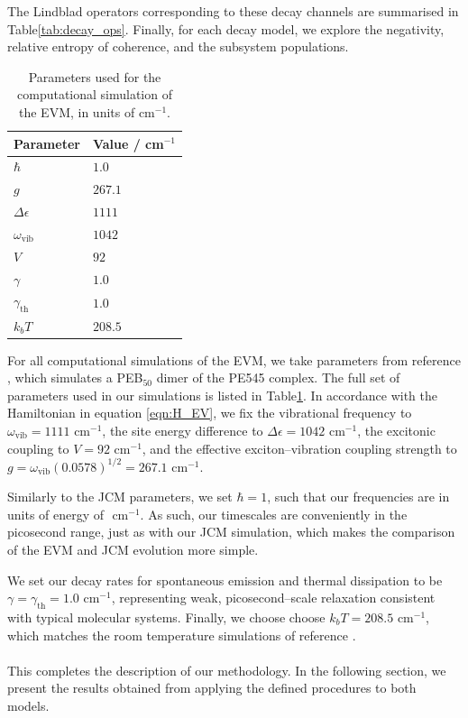 \documentclass[11pt]{article}
\begin{document}
The Lindblad operators corresponding to these decay channels are summarised in Table\ref{tab:decay_ops}. Finally, for each decay model, we explore the negativity, relative entropy of coherence, and the subsystem populations.

\begin{table}[h]
    \centering
    \caption{Parameters used for the computational simulation of the EVM, in units of cm$^{-1}$.}
    \begin{tabular}{l|l}
        \toprule
        \textbf{Parameter} & \textbf{Value / cm$^{-1}$} \\
        \midrule
        $\hbar$ & $1.0$ \\
        $g$ & $267.1$ \\
        $\Delta\epsilon$ & $1111$ \\
         $\omega_{\scriptscriptstyle \text{vib}}$ & $1042$ \\
        $V$ & $92$ \\
        $\gamma$ & $1.0$ \\
        $\gamma_{\scriptscriptstyle \text{th}}$ & $1.0$ \\
        $k_bT$ & $208.5$ \\
        \bottomrule
    \end{tabular}
    \label{tab:EVM_parameters}
\end{table}

\noindent For all computational simulations of the EVM, we take parameters from reference \cite{ExVib2014-Alexandra}, which simulates a PEB$_{50}$ dimer of the PE545 complex. The full set of parameters used in our simulations is listed in Table\ref{tab:EVM_parameters}. In accordance with the Hamiltonian in equation \eqref{eqn:H_EV}, we fix the vibrational frequency to $\omega_{\scriptscriptstyle \text{vib}} = 1111 \text{ cm}^{-1}$, the site energy difference to $\Delta\epsilon = 1042\text{ cm}^{-1}$, the excitonic coupling to $V = 92 \text{ cm}^{-1}$, and the effective exciton--vibration coupling strength to $g = \omega_{\scriptscriptstyle \text{vib}}(0.0578)^{1/2} = 267.1 \text{ cm}^{-1}.$ 

Similarly to the JCM parameters, we set $\hbar = 1$, such that our frequencies are in units of energy of $\text{ cm}^{-1}.$ As such, our timescales are conveniently in the picosecond range, just as with our JCM simulation, which makes the comparison of the EVM and JCM evolution more simple.

We set our decay rates for spontaneous emission and thermal dissipation to be $\gamma = \gamma_{\scriptscriptstyle\text{th}} = 1.0 \text{ cm}^{-1}$, representing weak, picosecond--scale relaxation consistent with typical molecular systems. Finally, we choose choose $k_bT = 208.5 \text{ cm}^{-1}$, which matches the room temperature simulations of reference \cite{ExVib2014-Alexandra}.\\
\\
This completes the description of our methodology. In the following section, we present the results obtained from applying the defined procedures to both models.
\end{document}
